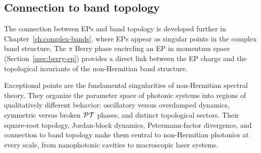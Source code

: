 \subsection{Connection to band topology}
\label{ssec:ep-band-topology}

The connection between EPs and band topology is developed further in
Chapter~\ref{ch:complex-bands}, where EPs appear as singular points in
the complex band structure. The $\pi$ Berry phase encircling an EP in
momentum space (Section~\ref{ssec:berry-ep}) provides a direct link
between the EP charge and the topological invariants of the non-Hermitian
band structure.

\begin{takeaway}
Exceptional points are the fundamental singularities of non-Hermitian
spectral theory. They organize the parameter space of photonic systems
into regions of qualitatively different behavior: oscillatory versus
overdamped dynamics, symmetric versus broken $\mathcal{PT}$ phases, and distinct
topological sectors. Their square-root topology, Jordan-block dynamics,
Petermann-factor divergence, and connection to band topology make them
central to non-Hermitian photonics at every scale, from nanophotonic
cavities to macroscopic laser systems.
\end{takeaway}
